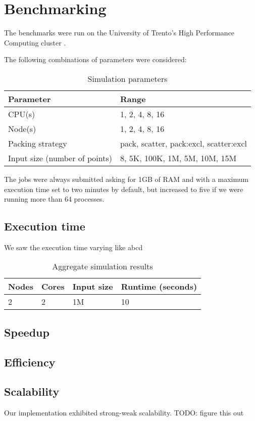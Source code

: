 \section{Benchmarking}

The benchmarks were run on the University of Trento's High Performance Computing cluster
.

The following combinations of parameters were considered:

\begin{table}[ht]
    \centering
    \caption{Simulation parameters}
    \begin{tabular}{l|l}
        \hline
        Parameter                     & Range                                    \\
        \hline
        CPU(s)                        & {1, 2, 4, 8, 16}                         \\
        Node(s)                       & {1, 2, 4, 8, 16}                         \\
        Packing strategy              & {pack, scatter, pack:excl, scatter:excl} \\
        Input size (number of points) & {8, 5K, 100K, 1M, 5M, 10M, 15M }         \\
        \hline
    \end{tabular}
\end{table}

The jobs were always submitted asking for 1GB of RAM and with a maximum execution time set to two minutes by default, but increased to five if we were running more than 64 processes.


\subsection{Execution time}

We saw the execution time varying like abcd
\begin{table}[ht]
    \centering
    \caption{Aggregate simulation results}
    \begin{tabular}{l|l|l|l}
        \hline
        Nodes & Cores & Input size & Runtime (seconds) \\
        \hline
        2     & 2     & 1M         & 10                \\
        \hline
    \end{tabular}
\end{table}

\subsection{Speedup}

\subsection{Efficiency}

\subsection{Scalability}
Our implementation exhibited {strong-weak} scalability. TODO: figure this out


